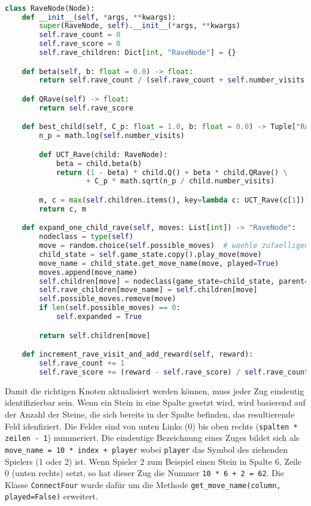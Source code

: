 \begin{lstlisting}[language=Python,label={lst:rave-node}]

class RaveNode(Node):
    def __init__(self, *args, **kwargs):
        super(RaveNode, self).__init__(*args, **kwargs)
        self.rave_count = 0
        self.rave_score = 0
        self.rave_children: Dict[int, "RaveNode"] = {}

    def beta(self, b: float = 0.0) -> float:
        return self.rave_count / (self.rave_count + self.number_visits + self.rave_count * self.number_visits * b * b)

    def QRave(self) -> float:
        return self.rave_score

    def best_child(self, C_p: float = 1.0, b: float = 0.0) -> Tuple["RaveNode", int]:
        n_p = math.log(self.number_visits)

        def UCT_Rave(child: RaveNode):
            beta = child.beta(b)
            return (1 - beta) * child.Q() + beta * child.QRave() \
                   + C_p * math.sqrt(n_p / child.number_visits)

        m, c = max(self.children.items(), key=lambda c: UCT_Rave(c[1]))
        return c, m

    def expand_one_child_rave(self, moves: List[int]) -> "RaveNode":
        nodeclass = type(self)
        move = random.choice(self.possible_moves)  # waehle zufaelligen Zug
        child_state = self.game_state.copy().play_move(move)
        move_name = child_state.get_move_name(move, played=True)
        moves.append(move_name)
        self.children[move] = nodeclass(game_state=child_state, parent=self)
        self.rave_children[move_name] = self.children[move]
        self.possible_moves.remove(move)
        if len(self.possible_moves) == 0:
            self.expanded = True

        return self.children[move]

    def increment_rave_visit_and_add_reward(self, reward):
        self.rave_count += 1
        self.rave_score += (reward - self.rave_score) / self.rave_count
\end{lstlisting}

Damit die richtigen Knoten aktualisiert werden können, muss jeder Zug eindeutig identifizierbar sein.
Wenn ein Stein in eine Spalte gesetzt wird, wird basierend auf der Anzahl der Steine, die sich bereits in der Spalte befinden, das resultierende Feld idenfiziert.
Die Felder sind von unten Links (0) bis oben rechts (\verb|spalten * zeilen - 1|) nummeriert.
Die eindeutige Bezeichnung eines Zuges bildet sich als \verb|move_name = 10 * index + player| wobei \verb|player| das Symbol des ziehenden Spielers (1 oder 2) ist.
Wenn Spieler 2 zum Beispiel einen Stein in Spalte 6, Zeile 0 (unten rechts) setzt, so hat dieser Zug die Nummer \verb|10 * 6 + 2 = 62|.
Die Klasse \verb|ConnectFour| wurde dafür um die Methode \verb|get_move_name(column, played=False)| erweitert.

